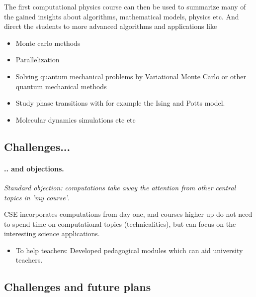\documentclass[%
twoside,                 %
final,                   %
10pt]{article}
\begin{document}
The first computational physics course can then be used to summarize many of the gained insights about algorithms, mathematical models, physics etc. And direct the students to more advanced algorithms and applications like

\begin{itemize}
\item Monte carlo methods

\item Parallelization

\item Solving quantum mechanical problems by Variational Monte Carlo  or other quantum mechanical methods

\item Study phase transitions with for example the Ising and Potts model.

\item Molecular dynamics simulations etc etc 
\end{itemize}

\noindent




\subsection{Challenges...}

\paragraph{.. and objections.}

\emph{Standard objection: computations take away the attention from other central topics in 'my course'}. 

CSE incorporates computations from day one, and courses higher up do not need to
spend time on computational topics  (technicalities), but can focus on the interesting
science applications.

\begin{itemize}
\item To help teachers: Developed pedagogical modules which can aid university teachers.
\end{itemize}

\noindent



\subsection{Challenges and future plans}
\end{document}
